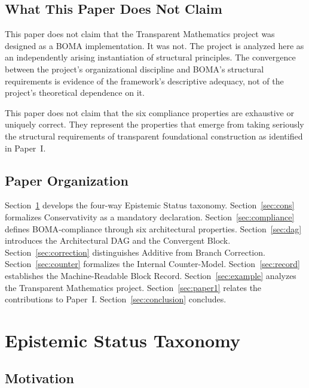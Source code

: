\documentclass[12pt, a4paper]{article}
\theoremstyle{plain}
\theoremstyle{definition}
\theoremstyle{remark}
\newcommand{\BOMA}{\textsf{BOMA}}
\begin{document}
\subsection{What This Paper Does Not Claim}
\label{subsec:notclaim}

This paper does not claim that the Transparent Mathematics project was
designed as a \BOMA{} implementation. It was not. The project is
analyzed here as an independently arising instantiation of structural
principles. The convergence between the project's organizational
discipline and \BOMA{}'s structural requirements is evidence of the
framework's descriptive adequacy, not of the project's theoretical
dependence on it.

This paper does not claim that the six compliance properties are
exhaustive or uniquely correct. They represent the properties that
emerge from taking seriously the structural requirements of transparent
foundational construction as identified in Paper~I.

\subsection{Paper Organization}
\label{subsec:organization}

Section~\ref{sec:epistemic} develops the four-way Epistemic Status
taxonomy. Section~\ref{sec:cons} formalizes Conservativity as a
mandatory declaration. Section~\ref{sec:compliance} defines
\BOMA{}-compliance through six architectural properties.
Section~\ref{sec:dag} introduces the Architectural DAG and the
Convergent Block. Section~\ref{sec:correction} distinguishes Additive
from Branch Correction. Section~\ref{sec:counter} formalizes the
Internal Counter-Model. Section~\ref{sec:record} establishes the
Machine-Readable Block Record. Section~\ref{sec:example} analyzes the
Transparent Mathematics project. Section~\ref{sec:paper1} relates the
contributions to Paper~I. Section~\ref{sec:conclusion} concludes.

\section{Epistemic Status Taxonomy}
\label{sec:epistemic}

\subsection{Motivation}
\label{subsec:ep-motivation}
\end{document}
